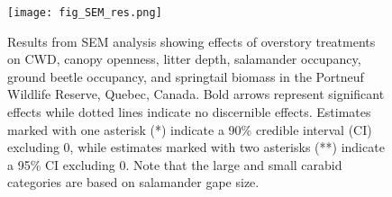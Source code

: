 \begin{figure}[h!]
	\centering
	\texttt{[image: fig\_SEM\_res.png]}
	\caption[Results from structural equation modeling analysis revealing effects of overstory treatments on coarse woody debris volume,
  canopy openness, litter depth, salamander occupancy, ground beetle occupancy, and springtail biomass.]
  {Results from SEM analysis showing effects of overstory treatments on CWD, 
  canopy openness, litter depth, salamander occupancy, ground beetle occupancy, and springtail biomass in the Portneuf Wildlife Reserve, 
  Quebec, Canada. Bold arrows represent significant effects while dotted lines indicate no discernible effects. 
  Estimates marked with one asterisk (*) indicate a 90\% credible interval (CI) excluding 0, while estimates marked with two asterisks (**) indicate a 95\% CI excluding 0. 
  Note that the large and small carabid categories are based on salamander gape size.}
	\label{fig:SEMres}
\end{figure}  

\vspace{10pt}

